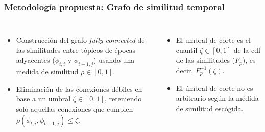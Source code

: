 \documentclass[
	spanish, %
	aspectratio=43, %
	hyperref={pdfencoding=auto,psdextra},
	xcolor={dvipsnames,table,usenames},
]{beamer}
\begin{document}
\begin{frame}[t]
\frametitle{Metodología propuesta: Grafo de similitud temporal}
\begin{columns}[t]
  \begin{itemize}
    \item Construcción del grafo \textit{fully connected} de las similitudes entre tópicos de épocas adyacentes ($\phi_{t,i}$ y $\phi_{t+1,j}$) usando una medida de similitud $\rho \in [0,1]$.
    \item Eliminación de las conexiones débiles en base a un umbral $\zeta \in [0,1]$, reteniendo solo aquellas conexiones que cumplen $\rho(\phi_{t,i}, \phi_{t+1,j})\leq \zeta$.

  \end{itemize}
		
  \begin{itemize}
    \item El umbral de corte es el cuantil $\zeta \in [0,1]$ de la cdf de las similitudes ($F_{p}$), es decir, $F_{p}^{-1}(\zeta)$.
    \item El úmbral de corte no es arbitrario según la médida de similitud escógida.
  \end{itemize}
\end{columns}

\end{frame}
\end{document}
